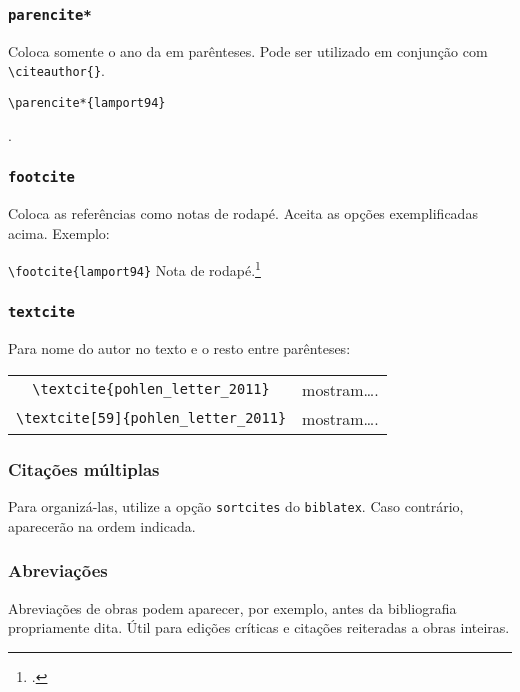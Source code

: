 \subsubsection*{\texttt{parencite*}}
Coloca somente o ano da em parênteses. Pode ser utilizado em conjunção com \verb+\citeauthor{}+.

\begin{center}
\verb+\parencite*{lamport94}+\qquad

 \parencite*{lamport94}.
\end{center}

\subsubsection*{\texttt{footcite}}
Coloca as referências como notas de rodapé. Aceita as opções exemplificadas acima. Exemplo:


\begin{center}
\verb+\footcite{lamport94}+\qquad
 Nota de rodapé.\footcite{lamport94}
\end{center}


\subsubsection*{\texttt{textcite}}
Para nome do autor no texto e o resto entre parênteses:

\begin{tabular}{cc}
\centering
\verb+\textcite{pohlen_letter_2011}+ & \textcite{pohlen_letter_2011} mostram\ldots .\\

\verb+\textcite[59]{pohlen_letter_2011}+ & \textcite[59]{pohlen_letter_2011} mostram\ldots .\\

\end{tabular}

\subsubsection*{Citações múltiplas}
Para organizá-las, utilize a opção \texttt{sortcites} do \texttt{biblatex}. Caso contrário, aparecerão na ordem indicada.

\subsubsection*{Abreviações}
Abreviações de obras podem aparecer, por exemplo, antes da bibliografia propriamente dita. Útil para edições críticas e citações reiteradas a obras inteiras.

